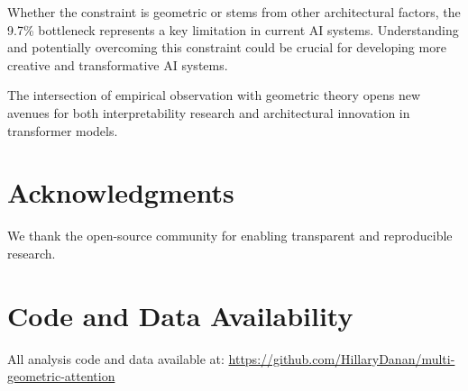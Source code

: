 \documentclass[pmlr,onecolumn]{jmlr}
\begin{document}
Whether the constraint is geometric or stems from other architectural factors, the 9.7\% bottleneck represents a key limitation in current AI systems. Understanding and potentially overcoming this constraint could be crucial for developing more creative and transformative AI systems.

The intersection of empirical observation with geometric theory opens new avenues for both interpretability research and architectural innovation in transformer models.

\section*{Acknowledgments}

We thank the open-source community for enabling transparent and reproducible research.

\section*{Code and Data Availability}

All analysis code and data available at: \url{https://github.com/HillaryDanan/multi-geometric-attention}
\end{document}
